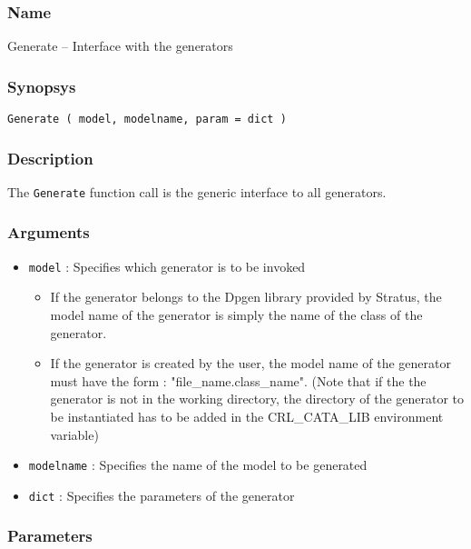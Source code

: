 \subsubsection{Name}

Generate -- Interface with the generators

\subsubsection{Synopsys}

\begin{verbatim}
Generate ( model, modelname, param = dict )
\end{verbatim}

\subsubsection{Description}

The  \verb-Generate-  function call is the generic interface to all generators.

\subsubsection{Arguments}

\begin{itemize}
    \item \verb-model- : Specifies which generator is to be invoked
    \begin{itemize}
        \item If the generator belongs to the Dpgen library provided by Stratus, the model name of the generator is simply the name of the class of the generator.
        \item If the generator is created by the user, the model name of the generator must have the form : "file\_name.class\_name". (Note that if the the generator is not in the working directory, the directory of the generator to be instantiated has to be added in the CRL\_CATA\_LIB environment variable)
    \end{itemize}
    \item \verb-modelname- : Specifies the name of the model to be generated
    \item \verb-dict- : Specifies the parameters of the generator
\end{itemize}

\subsubsection{Parameters}

